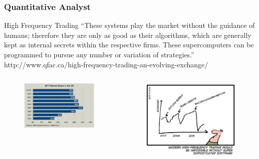 \documentclass{beamer}
\begin{document}
\begin{frame}
  \frametitle{Quantitative Analyst}
  \center High Frequency Trading
  \center ``These systems play the market without the guidance
  of humans; therefore they are only as good as their algorithms, which are
  generally kept as internal secrets within the respective firms. These
  supercomputers can be programmed to pursue any number or variation of
  strategies.''
  {\small http://www.qfac.ca/high-frequency-trading-an-evolving-exchange/ }
  \begin{columns}
    \begin{column}{0.5\textwidth}
      \begin{figure} \centering
	\includegraphics[width=.9\textwidth]{figs/hft/market-share.jpg}
      \end{figure}
    \end{column}
    \begin{column}{0.5\textwidth}
      \begin{figure} \centering
	\includegraphics[width=.9\textwidth]{figs/hft/trading.png}
      \end{figure}
    \end{column}
  \end{columns}
\end{frame}
\end{document}
